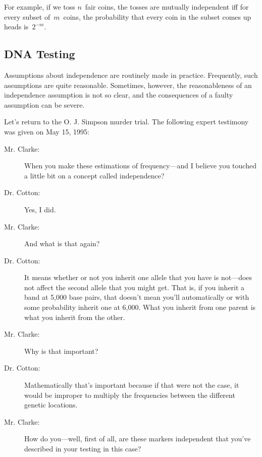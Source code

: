 \begin{editingnotes}
For example, if we toss $n$~fair coins, the tosses are mutually
independent iff for every subset of~$m$~coins, the probability that
every coin in the subset comes up heads is~$2^{-m}$.
\end{editingnotes}

\subsection{DNA Testing}

Assumptions about independence are routinely made in practice.
Frequently, such assumptions are quite reasonable.  Sometimes,
however, the reasonableness of an independence assumption is not so
clear, and the consequences of a faulty assumption can be severe.

Let's return to the O. J. Simpson murder trial.  The following expert
testimony was given on May 15, 1995:
\begin{description}

\item[Mr. Clarke:] When you make these estimations of frequency---and
I believe you touched a little bit on a concept called independence?

\item[Dr. Cotton:] Yes, I did.

\item[Mr. Clarke:] And what is that again?

\item[Dr. Cotton:] It means whether or not you inherit one allele that
you have is not---does not affect the second allele that you might
get.  That is, if you inherit a band at 5,000 base pairs, that doesn't
mean you'll automatically or with some probability inherit one at
6,000.  What you inherit from one parent is what you inherit from the
other.

\item[Mr. Clarke:] Why is that important?

\item[Dr. Cotton:] Mathematically that's important because if that
were not the case, it would be improper to multiply the frequencies
between the different genetic locations.

\item[Mr. Clarke:] How do you---well, first of all, are these markers
independent that you've described in your testing in this case?

\end{description}

